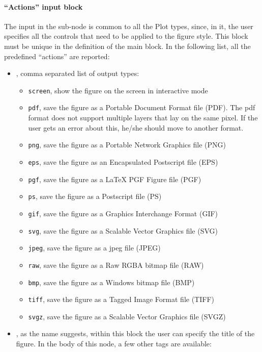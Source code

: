 \paragraph{``Actions'' input block \label{sec:actionsBlock}}
The input in the  sub-node is common to all the Plot types,
since, in it, the user specifies all the controls that need to be applied to the
figure style.
%
This block must be unique in the definition of the  main block.
%
In the following list, all the predefined ``actions'' are reported:
\vspace{-5mm}
\begin{itemize}
  \itemsep0em
  \item {}, comma separated list of output types:
     \begin{itemize}
    \item \texttt{screen}, show the figure on the screen in interactive mode
    \item \texttt{pdf}, save the figure as a Portable Document Format file (PDF).
    \nb The pdf format does not support multiple layers that lay on the same pixel. If the
    user gets an error about this, he/she should move to another format.
    \item \texttt{png}, save the figure as a Portable Network Graphics file
    (PNG)
    \item \texttt{eps}, save the figure as an Encapsulated Postscript file (EPS)
    \item \texttt{pgf}, save the figure as a LaTeX PGF Figure file (PGF)
    \item \texttt{ps}, save the figure as a Postscript file (PS)
    \item \texttt{gif}, save the figure as a Graphics Interchange Format (GIF)
    \item \texttt{svg}, save the figure as a Scalable Vector Graphics file (SVG)
    \item \texttt{jpeg}, save the figure as a jpeg file (JPEG)
    \item \texttt{raw}, save the figure as a Raw RGBA bitmap file (RAW)
    \item \texttt{bmp}, save the figure as a Windows bitmap file (BMP)
    \item \texttt{tiff}, save the figure as a Tagged Image Format file (TIFF)
    \item \texttt{svgz}, save the figure as a Scalable Vector Graphics file
    (SVGZ)
      \end{itemize}
  \item {}, as the name suggests, within this block the user can
  specify the title of the figure.
  In the body of this node, a few other tags are available:


\end{itemize}

